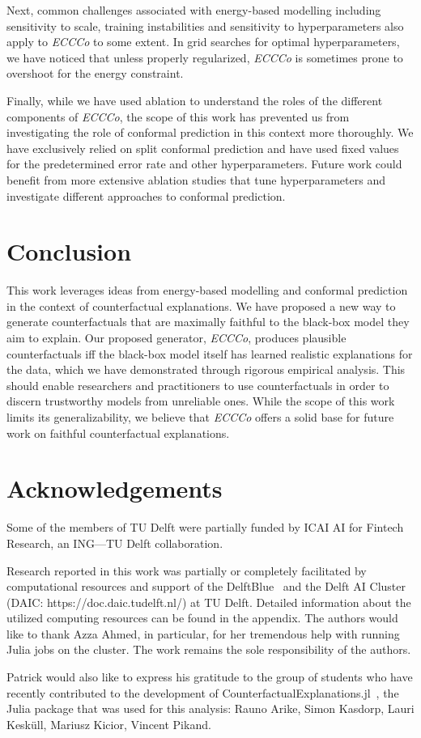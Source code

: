 \documentclass[letterpaper]{article} %
\begin{document}
Next, common challenges associated with energy-based modelling including sensitivity to scale, training instabilities and sensitivity to hyperparameters also apply to \textit{ECCCo} to some extent. In grid searches for optimal hyperparameters, we have noticed that unless properly regularized, \textit{ECCCo} is sometimes prone to overshoot for the energy constraint. 

Finally, while we have used ablation to understand the roles of the different components of \textit{ECCCo}, the scope of this work has prevented us from investigating the role of conformal prediction in this context more thoroughly. We have exclusively relied on split conformal prediction and have used fixed values for the predetermined error rate and other hyperparameters. Future work could benefit from more extensive ablation studies that tune hyperparameters and investigate different approaches to conformal prediction.

\section{Conclusion}

This work leverages ideas from energy-based modelling and conformal prediction in the context of counterfactual explanations. We have proposed a new way to generate counterfactuals that are maximally faithful to the black-box model they aim to explain. Our proposed generator, \textit{ECCCo}, produces plausible counterfactuals iff the black-box model itself has learned realistic explanations for the data, which we have demonstrated through rigorous empirical analysis. This should enable researchers and practitioners to use counterfactuals in order to discern trustworthy models from unreliable ones. While the scope of this work limits its generalizability, we believe that \textit{ECCCo} offers a solid base for future work on faithful counterfactual explanations.

\section*{Acknowledgements}

Some of the members of TU Delft were partially funded by ICAI AI for Fintech Research, an ING---TU Delft
collaboration. 

Research reported in this work was partially or completely facilitated by computational resources and support of the DelftBlue~\citep{DHPC2022} and the Delft AI Cluster (DAIC: https://doc.daic.tudelft.nl/) at TU Delft. Detailed information about the utilized computing resources can be found in the appendix. The authors would like to thank Azza Ahmed, in particular, for her tremendous help with running Julia jobs on the cluster. The work remains the sole responsibility of the authors.

Patrick would also like to express his gratitude to the group of students who have recently contributed to the development of CounterfactualExplanations.jl~\citep{altmeyer2023explaining}, the Julia package that was used for this analysis: Rauno Arike, Simon Kasdorp, Lauri Kesküll, Mariusz Kicior, Vincent Pikand.


\end{document}
